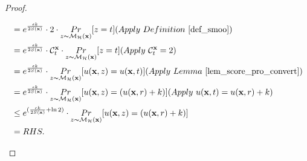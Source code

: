 \documentclass{article}
\begin{document}
\begin{proof}
\begin{itemize}
\begin{itemize}
\begin{equation*}
\begin{split}
      & = e^{\frac{\epsilon k}{2 S(\dataobs)}} \cdot 2 \cdot \hexpmechPr{\dataobs}{z = t}                                 (Apply\ Definition\ \ref{def_smoo})\\
      & = e^{\frac{\epsilon k}{2 S(\dataobs)}} \cdot \cardinality{\dataobs}{t} \cdot \hexpmechPr{\dataobs}{z = t}         (Apply \ \cardinality{\dataobs}{t} = 2)\\
      & = e^{\frac{\epsilon k}{2 S(\dataobs)}} \cdot \hexpmechPr{\dataobs}{\ux{z} = \ux{t}}                               (Apply \ Lemma\ \ref{lem_score_pro_convert})\\
      & = e^{\frac{\epsilon k}{2 S(\dataobs)}} \cdot \hexpmechPr{\dataobs}{\ux{z} = (\ux{r} + k)}                         (Apply \ \ux{t} = \ux{r} + k)\\
      & \leq e^{(\frac{\epsilon k}{2 S(\dataobs)} + \ln 2)} \cdot \hexpmechPr{\dataobs}{\ux{z} = (\ux{r} + k)}\\
      & = RHS.
      \end{split}
      \end{equation*}


\end{itemize}
\end{itemize}
\end{proof}
\end{document}
